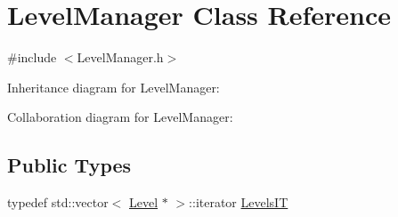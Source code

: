\hypertarget{classLevelManager}{}\section{Level\+Manager Class Reference}
\label{classLevelManager}


{\ttfamily \#include $<$Level\+Manager.\+h$>$}



Inheritance diagram for Level\+Manager\+:


Collaboration diagram for Level\+Manager\+:
\subsection*{Public Types}
\begin{DoxyCompactItemize}
\item 
typedef std\+::vector$<$ \hyperlink{classLevel}{Level} $\ast$ $>$\+::iterator \hyperlink{classLevelManager_a6fddbbcd58d96c3b1748eb4d2a801f35}{Levels\+IT}
\end{DoxyCompactItemize}
